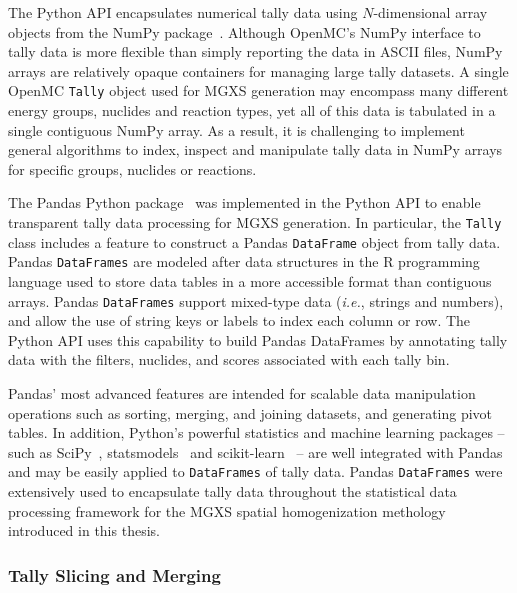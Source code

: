 The Python API encapsulates numerical tally data using $N$-dimensional array objects from the NumPy package~\cite{walt2011numpy}. Although OpenMC's NumPy interface to tally data is more flexible than simply reporting the data in \ac{ASCII} files, NumPy arrays are relatively opaque containers for managing large tally datasets. A single OpenMC \texttt{Tally} object used for \ac{MGXS} generation may encompass many different energy groups, nuclides and reaction types, yet all of this data is tabulated in a single contiguous NumPy array. As a result, it is challenging to implement general algorithms to index, inspect and manipulate tally data in NumPy arrays for specific groups, nuclides or reactions.

The Pandas Python package~\cite{mckinney2010pandas} was implemented in the Python \ac{API} to enable transparent tally data processing for \ac{MGXS} generation. In particular, the \texttt{Tally} class includes a feature to construct a Pandas 
\texttt{DataFrame} object from tally data. Pandas \texttt{DataFrames} are modeled after data structures in the \textsf{R} programming language used to store data tables in a more accessible format than contiguous arrays. Pandas \texttt{DataFrames} support mixed-type data (\textit{i.e.}, strings and numbers), and allow the use of string keys or labels to index each column or row. The Python \ac{API} uses this capability to build Pandas DataFrames by annotating tally data with the filters, nuclides, and scores associated with each tally bin. 

Pandas' most advanced features are intended for scalable data manipulation operations such as sorting, merging, and joining datasets, and generating pivot tables. In addition, Python's powerful statistics and machine learning packages -- such as SciPy~\cite{jones2011scipy}, statsmodels~\cite{seabold2010statsmodels} and scikit-learn~\cite{pedregosa2011sklearn} -- are well integrated with Pandas and may be easily applied to \texttt{DataFrames} of tally data. Pandas \texttt{DataFrames} were extensively used to encapsulate tally data throughout the statistical data processing framework for the \ac{MGXS} spatial homogenization methology introduced in this thesis.

\subsubsection{Tally Slicing and Merging}
\label{subsubsec:chap4-tally-slice-merge}

